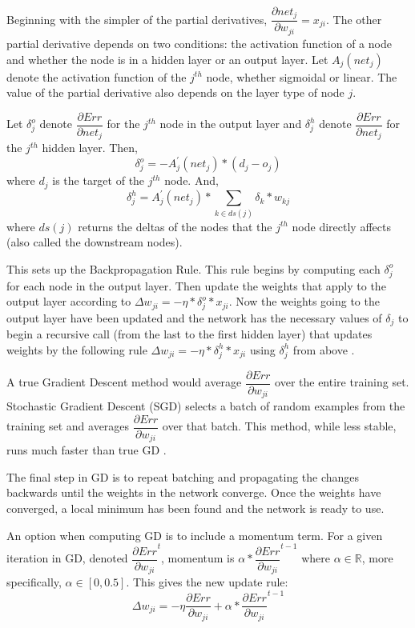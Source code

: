 \documentclass[twoside,11pt]{article}
\newcommand{\jth}{$j^{th}$ }
\begin{document}
Beginning with the simpler of the partial derivatives, $\dfrac{\partial net_j}{\partial w_{ji}} = x_{ji}$.
The other partial derivative depends on two conditions: the activation function of a node and whether the node is in a hidden layer or an output layer. Let $A_j(net_j)$ denote the activation function of the \jth node, whether sigmoidal or linear.
The value of the partial derivative also depends on the layer type of node $j$.

Let $\delta _j^o$ denote $\dfrac{\partial Err}{\partial net_{j}}$ for the \jth node in the output layer and $\delta ^h_j$ denote $\dfrac{\partial Err}{\partial net_{j}}$ for the \jth hidden layer.
Then,
$$\delta _j^o = -A^\prime _j (net_j) * (d_j - o_j)$$
where $d_j$ is the target of the \jth node. And,
$$\delta ^h_j = A^\prime _j (net_j) * \sum_{k \in ds(j)} \delta _k * w_{kj}$$
where $ds(j)$ returns the deltas of the nodes that the \jth node directly affects (also called the downstream nodes).

This sets up the Backpropagation Rule. This rule begins by computing each $\delta _j^o$ for each node in the output layer. Then update the weights that apply to the output layer according to
$\Delta w_{ji} = - \eta * \delta _j^o * x_{ji}$.
Now the weights going to the output layer have been updated and the network has the necessary values of $\delta _j$ to begin a recursive call (from the last to the first hidden layer) that updates weights by the following rule
$\Delta w_{ji} = - \eta * \delta _j^h * x_{ji}$ using $\delta _j^h$
from above \citep{rumelhart1988learning}.

A true Gradient Descent method would average $\dfrac{\partial Err}{\partial w_{ji}}$ over the entire training set. Stochastic Gradient Descent (SGD) selects a batch of random examples from the training set and averages $\dfrac{\partial Err}{\partial w_{ji}}$ over that batch. This method, while less stable, runs much faster than true GD \citep{svozil1997ffnn}.

The final step in GD is to repeat batching and propagating the changes backwards until the weights in the network converge. Once the weights have converged, a local minimum has been found and the network is ready to use.

An option when computing GD is to include a momentum term. For a given iteration in GD, denoted
$\dfrac{\partial Err}{\partial w_{ji}}^t$, momentum is $\alpha * \dfrac{\partial Err}{\partial w_{ji}}^{t-1}$ where $\alpha \in \mathbb{R}$, more specifically, $\alpha \in [0,0.5]$.
This gives the new update rule:
$$\Delta w_{ji} = - \eta \dfrac{\partial Err}{\partial w_{ji}} + \alpha * \dfrac{\partial Err}{\partial w_{ji}}^{t-1}$$
\end{document}
